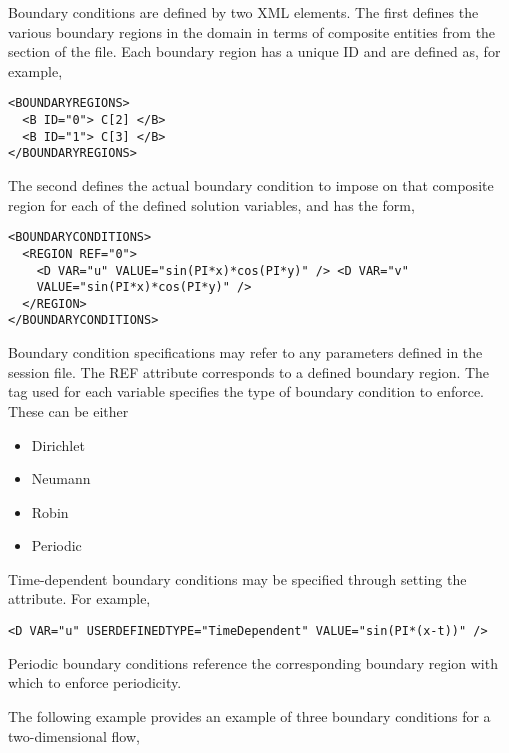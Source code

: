 Boundary conditions are defined by two XML elements. The first defines the
various boundary regions in the domain in terms of composite entities from the
 section of the file. Each boundary region has a unique ID and
are defined as, for example,

\begin{lstlisting}[style=XMLStyle]
<BOUNDARYREGIONS>
  <B ID="0"> C[2] </B>
  <B ID="1"> C[3] </B>
</BOUNDARYREGIONS>
\end{lstlisting}

The second defines the actual boundary condition to impose on that composite
region for each of the defined solution variables, and has the form,

\begin{lstlisting}[style=XMLStyle] 
<BOUNDARYCONDITIONS>
  <REGION REF="0">
    <D VAR="u" VALUE="sin(PI*x)*cos(PI*y)" /> <D VAR="v"
    VALUE="sin(PI*x)*cos(PI*y)" />
  </REGION>
</BOUNDARYCONDITIONS>
\end{lstlisting}

Boundary condition specifications may refer to any parameters defined in the
session file. The REF attribute corresponds to a defined boundary region. The
tag used for each variable specifies the type of boundary condition to enforce.
These can be either
\begin{itemize}
    \item {} Dirichlet 
    \item {} Neumann 
    \item {} Robin 
    \item {} Periodic
\end{itemize}


Time-dependent boundary conditions may be specified through setting the
 attribute. For example,

\begin{lstlisting}[style=XMLStyle]
<D VAR="u" USERDEFINEDTYPE="TimeDependent" VALUE="sin(PI*(x-t))" />
\end{lstlisting}

Periodic boundary conditions reference the corresponding boundary region with
which to enforce periodicity.

The following example provides an example of three boundary conditions for a
two-dimensional flow,

